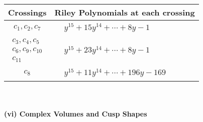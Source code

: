 \documentclass[1p]{elsarticle_modified}
\theoremstyle{definition}
\begin{document}
\begin{tabular}{m{50pt}|m{274pt}}
Crossings & \hspace{64pt}Riley Polynomials at each crossing \\
\hline $$\begin{aligned}c_{1},c_{2},c_{7}\end{aligned}$$&$\begin{aligned}
&y^{15}+15 y^{14}+\cdots+8 y-1
\end{aligned}$\\
\hline $$\begin{aligned}c_{3},c_{4},c_{5}\\c_{6},c_{9},c_{10}\\c_{11}\end{aligned}$$&$\begin{aligned}
&y^{15}+23 y^{14}+\cdots+8 y-1
\end{aligned}$\\
\hline $$\begin{aligned}c_{8}\end{aligned}$$&$\begin{aligned}
&y^{15}+11 y^{14}+\cdots+196 y-169
\end{aligned}$\\
\hline
\end{tabular}\\~\\
\newpage\flushleft \textbf{(vi) Complex Volumes and Cusp Shapes}
\end{document}
